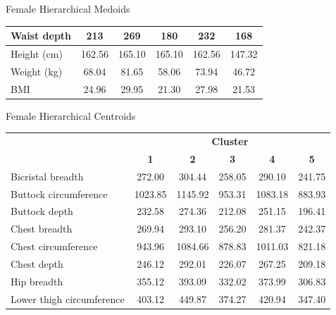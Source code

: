 \documentclass[10pt]{beamer}
\begin{document}
\begin{frame}{Female Hierarchical Medoids}
\begin{tabular}{lccccc}
		Waist depth                  & 213                                  & 269        & 180        & 232        & 168        \\
		\hline
		Height (cm)                  & 162.56                               & 165.10     & 165.10     & 162.56     & 147.32     \\
		Weight (kg)                  & 68.04                                & 81.65      & 58.06      & 73.94      & 46.72      \\
		BMI                          & 24.96                                & 29.95      & 21.30      & 27.98      & 21.53      \\
	\end{tabular}
\end{frame}

\begin{frame}{Female Hierarchical Centroids}
	\scriptsize
	\centering
	\begin{tabular}{lccccc}
		\cline{2-6}
		                             & \multicolumn{5}{c}{\textbf{Cluster}}                                                             \\
		                             & \textbf{1}                           & \textbf{2}   & \textbf{3}   & \textbf{4}   & \textbf{5}   \\
		\hline\hline
		Bicristal breadth            & 272.00                               & 304.44       & 258.05       & 290.10       & 241.75       \\
		Buttock circumference        & 1023.85                              & 1145.92      & 953.31       & 1083.18      & 883.93       \\
		Buttock depth                & 232.58                               & 274.36       & 212.08       & 251.15       & 196.41       \\
		Chest breadth                & 269.94                               & 293.10       & 256.20       & 281.37       & 242.37       \\
		Chest circumference          & 943.96                               & 1084.66      & 878.83       & 1011.03      & 821.18       \\
		Chest depth                  & 246.12                               & 292.01       & 226.07       & 267.25       & 209.18       \\
		Hip breadth                  & 355.12                               & 393.09       & 332.02       & 373.99       & 306.83       \\
		Lower thigh circumference    & 403.12                               & 449.87       & 374.27       & 420.94       & 347.40       \\

\end{tabular}
\end{frame}
\end{document}
